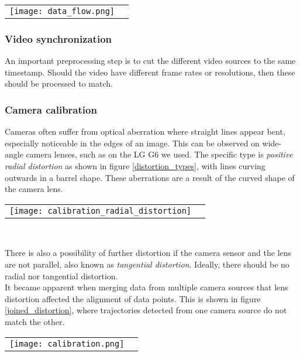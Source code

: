 \color{red}
\raggedbottom
\begin{tabular}{@{}cc}
\texttt{[image: data\_flow.png]} 
\end{tabular}
\label{data}
\raggedbottom
\color{black}

\subsubsection{Video synchronization}
An important preprocessing step is to cut the different video sources to the same timestamp.
Should the video have different frame rates or resolutions, then these should be processed to match.

\subsubsection{Camera calibration}
Cameras often suffer from optical aberration where straight lines appear bent, especially noticeable in the edges of an image. 
This can be observed on wide-angle camera lenses, such as on the LG G6 we used.
The specific type is \textit{positive radial distortion} as shown in figure \ref{distortion_types}, with lines curving outwards in a barrel shape.
These aberrations are a result of the curved shape of the camera lens.
\ \\ 

\raggedbottom
\begin{tabular}{@{}cc}
\texttt{[image: calibration\_radial\_distortion]} 
\end{tabular}
\label{distortion_types}
\

There is also a possibility of further distortion if the camera sensor and the lens are not parallel, also known as \textit{tangential distortion}.
Ideally, there should be no radial nor tangential distortion.
\ \\
It became apparent when merging data from multiple camera sources that lens distortion affected the alignment of data points.
This is shown in figure \ref{joined_distortion}, where trajectories detected from one camera source do not match the other.

\raggedbottom
\begin{tabular}{@{}cc}
\texttt{[image: calibration.png]}
\end{tabular}
\label{joined_distortion}
\

